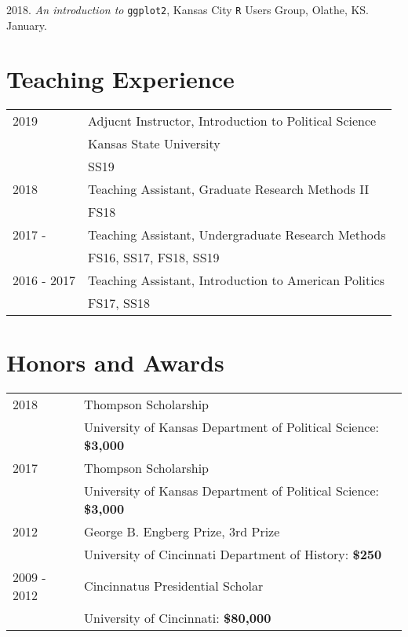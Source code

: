 \documentclass[margin,line,pifont,palatino,courier]{res}
\begin{document}
\begin{resume}
2018. \emph{An introduction to} \verb+ggplot2+, Kansas City \verb+R+ Users Group,
Olathe, KS. January.

\newpage
\section{\sc Teaching Experience}

\begin{tabular}{@{}p{0.8in}p{3.5in}}
  2019        & Adjucnt Instructor, Introduction to Political Science\\
              & Kansas State University\\
              & SS19\\
  2018        & Teaching Assistant, Graduate Research Methods II\\
              & FS18\\
  2017 -      & Teaching Assistant, Undergraduate Research Methods\\
              & FS16, SS17, FS18, SS19\\
  2016 - 2017 & Teaching Assistant, Introduction to American Politics\\
              & FS17, SS18\\
\end{tabular}



\section{\sc Honors and Awards}

\begin{tabular}{@{}p{0.8in}p{4in}}
2018       & Thompson Scholarship\\
           & University of Kansas Department of Political Science: \bf{\$3,000}  \\
2017       & Thompson Scholarship\\
           & University of Kansas Department of Political Science: \bf{\$3,000}  \\
2012       & George B. Engberg Prize, 3rd Prize  \\
           & University of Cincinnati Department of History: \bf{\$250}  \\
2009 - 2012 & Cincinnatus Presidential Scholar\\
           & University of Cincinnati: \bf{\$80,000} \\
\end{tabular}



\end{resume}
\end{document}
